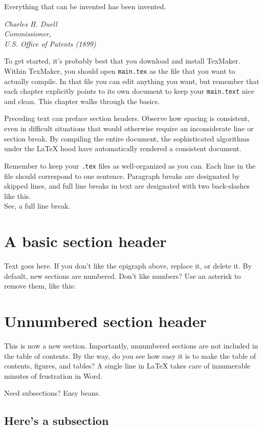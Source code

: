 \singlespacing
\epigraph{Everything that can be invented has been invented.}{\textit{Charles H. Duell\\ Commissioner, \\ U.S. Office of Patents (1899)}} 
\doublespace

To get started, it's probably best that you download and install TexMaker.
Within TexMaker, you should open \texttt{main.tex} as the file that you want to actually compile.
In that file you can edit anything you want, but remember that each chapter explicitly points to its own document to keep your \texttt{main.text} nice and clean. 
This chapter walks through the basics. 

Preceding text can preface section headers.
Observe how spacing is consistent, even in difficult situations that would otherwise require an inconsiderate line or section break.
By compiling the entire document, the sophisticated algorithms under the LaTeX hood have automatically rendered a consistent document.

Remember to keep your \texttt{.tex} files as well-organized as you can.
Each line in the file should correspond to one sentence.
Paragraph breaks are designated by skipped lines, and full line breaks in text are designated with two back-slashes like this.\\

See, a full line break.


\section{A basic section header}

Text goes here. 
If you don't like the epigraph above, replace it, or delete it. 
By default, new sections are numbered. 
Don't like numbers? 
Use an asterisk to remove them, like this:

\section*{Unnumbered section header}

This is now a new section. 
Importantly, unnumbered sections are not included in the table of contents.
By the way, do you see how easy it is to make the table of contents, figures, and tables?
A single line in LaTeX takes care of innumerable minutes of frustration in Word.

Need subsections? 
Easy beans.

\subsection{Here's a subsection}

